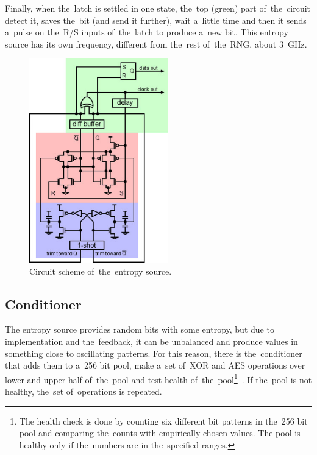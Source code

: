 \par{
Finally, when the~latch is settled in one state, the~top (green) part 
of~the~circuit detect it, saves the~bit (and send it further), wait 
a~little time and then it sends a~pulse on the~R/S inputs of~the~latch 
to produce a~new bit. This entropy source has its own frequency, different 
from the~rest of~the~RNG, about 3~GHz.
}
\begin{figure}[h!]
  \centering
 \includegraphics[width=6cm,keepaspectratio]{fig/entropy-source-circuit} %
\caption{Circuit scheme of~the~entropy source\cite{UnderstandingRdRandElectronic}.}
\label{fig:ES-circuit}
\end{figure}

\subsection{Conditioner}
\par{
The entropy source provides random bits with some entropy, 
but due to implementation and the~feedback, it can be unbalanced 
and produce values in something close to oscillating patterns. 
For this reason, there is the~conditioner that adds them to a~256 bit pool, 
make a~set of~XOR and AES operations over lower and upper half of~the~pool 
and test health of~the~pool\footnote{The health check is done by counting six 
different bit patterns in the~256 bit pool and comparing the~counts 
with empirically chosen values. The pool is healthy only if the~numbers are 
in the~specified ranges.
}~\cite{AnalysisOfDRNG,UnderstandingRdRandElectronic}. 
If the~pool is not healthy, the~set of~operations is repeated. 
}
